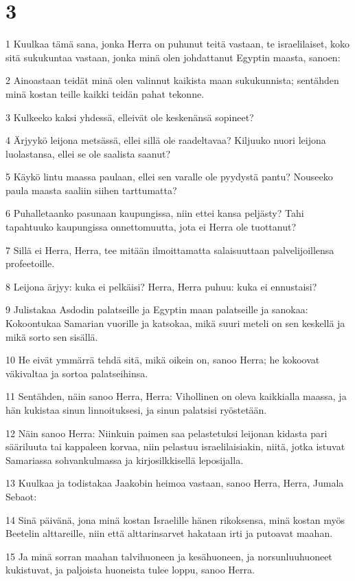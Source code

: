 \chapter{3}

\par 1 Kuulkaa tämä sana, jonka Herra on puhunut teitä vastaan, te israelilaiset, koko sitä sukukuntaa vastaan, jonka minä olen johdattanut Egyptin maasta, sanoen:
\par 2 Ainoastaan teidät minä olen valinnut kaikista maan sukukunnista; sentähden minä kostan teille kaikki teidän pahat tekonne.
\par 3 Kulkeeko kaksi yhdessä, elleivät ole keskenänsä sopineet?
\par 4 Ärjyykö leijona metsässä, ellei sillä ole raadeltavaa? Kiljuuko nuori leijona luolastansa, ellei se ole saalista saanut?
\par 5 Käykö lintu maassa paulaan, ellei sen varalle ole pyydystä pantu? Nouseeko paula maasta saaliin siihen tarttumatta?
\par 6 Puhalletaanko pasunaan kaupungissa, niin ettei kansa peljästy? Tahi tapahtuuko kaupungissa onnettomuutta, jota ei Herra ole tuottanut?
\par 7 Sillä ei Herra, Herra, tee mitään ilmoittamatta salaisuuttaan palvelijoillensa profeetoille.
\par 8 Leijona ärjyy: kuka ei pelkäisi? Herra, Herra puhuu: kuka ei ennustaisi?
\par 9 Julistakaa Asdodin palatseille ja Egyptin maan palatseille ja sanokaa: Kokoontukaa Samarian vuorille ja katsokaa, mikä suuri meteli on sen keskellä ja mikä sorto sen sisällä.
\par 10 He eivät ymmärrä tehdä sitä, mikä oikein on, sanoo Herra; he kokoovat väkivaltaa ja sortoa palatseihinsa.
\par 11 Sentähden, näin sanoo Herra, Herra: Vihollinen on oleva kaikkialla maassa, ja hän kukistaa sinun linnoituksesi, ja sinun palatsisi ryöstetään.
\par 12 Näin sanoo Herra: Niinkuin paimen saa pelastetuksi leijonan kidasta pari sääriluuta tai kappaleen korvaa, niin pelastuu israelilaisiakin, niitä, jotka istuvat Samariassa sohvankulmassa ja kirjosilkkisellä leposijalla.
\par 13 Kuulkaa ja todistakaa Jaakobin heimoa vastaan, sanoo Herra, Herra, Jumala Sebaot:
\par 14 Sinä päivänä, jona minä kostan Israelille hänen rikoksensa, minä kostan myös Beetelin alttareille, niin että alttarinsarvet hakataan irti ja putoavat maahan.
\par 15 Ja minä sorran maahan talvihuoneen ja kesähuoneen, ja norsunluuhuoneet kukistuvat, ja paljoista huoneista tulee loppu, sanoo Herra.

